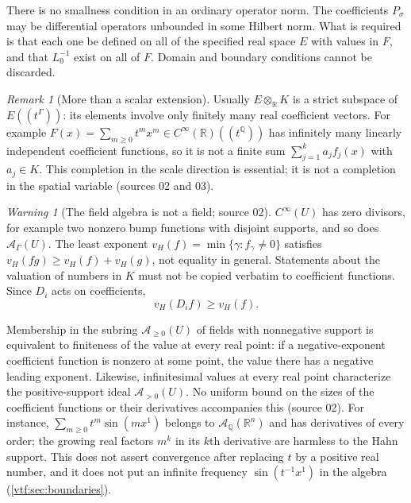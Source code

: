 \documentclass[11pt,letterpaper]{article}
\theoremstyle{definition}
\theoremstyle{remark}
\newtheorem{remark}[theorem]{Remark}
\newtheorem{warning}[theorem]{Warning}
\newcommand{\R}{\mathbb R}\newcommand{\C}{\mathbb C}
\newcommand{\Q}{\mathbb Q}\newcommand{\N}{\mathbb N}\newcommand{\Z}{\mathbb Z}
\newcommand{\A}{\mathscr A}\newcommand{\OO}{\mathcal O}\newcommand{\mm}{\mathfrak m}
\newcommand{\vH}{v_{\!H}}
\begin{document}
There is no smallness condition in an ordinary operator norm. The coefficients $P_\sigma$ may be differential operators unbounded in some Hilbert norm. What is required is that each one be defined on all of the specified real space $E$ with values in $F$, and that $L_0^{-1}$ exist on all of $F$. Domain and boundary conditions cannot be discarded.

\begin{remark}[More than a scalar extension]\label{vtf:3d:rem:nottensor}
Usually $E\otimes_\R K$ is a strict subspace of $E((t^\Gamma))$: its elements
involve only finitely many real coefficient vectors. For example
$F(x)=\sum_{m\ge0}t^mx^m\in C^\infty(\R)((t^\Q))$ has infinitely many linearly
independent coefficient functions, so it is not a finite sum
$\sum_{j=1}^ka_jf_j(x)$ with $a_j\in K$. This completion in the scale direction
is essential; it is not a completion in the spatial variable (sources 02 and
03).
\end{remark}

\begin{warning}[The field algebra is not a field; source 02]
$C^\infty(U)$ has zero divisors, for example two nonzero bump functions with
disjoint supports, and so does $\A_\Gamma(U)$. The least exponent
$\vH(f)=\min\{\gamma:f_\gamma\ne0\}$ satisfies $\vH(fg)\ge\vH(f)+\vH(g)$, not
equality in general. Statements about the valuation of numbers in $K$ must not be
copied verbatim to coefficient functions. Since $D_i$ acts on coefficients,
\begin{equation}\label{vtf:mink:eq:derivativeorder}
 \vH(D_if)\ge\vH(f).
\end{equation}
\end{warning}

Membership in the subring $\A_{\ge0}(U)$ of fields with nonnegative support is
equivalent to finiteness of the value at every real point: if a
negative-exponent coefficient function is nonzero at some point, the value there
has a negative leading exponent. Likewise, infinitesimal values at every real
point characterize the positive-support ideal $\A_{>0}(U)$. No uniform bound on
the sizes of the coefficient functions or their derivatives accompanies this
(source 02). For instance, $\sum_{m\ge0}t^m\sin(mx^1)$ belongs to $\A_\Q(\R^n)$
and has derivatives of every order; the growing real factors $m^k$ in its
$k$th derivative are harmless to the Hahn support. This does not assert
convergence after replacing $t$ by a positive real number, and it does not put
an infinite frequency $\sin(t^{-1}x^1)$ in the algebra (\cref{vtf:sec:boundaries}).
\end{document}
